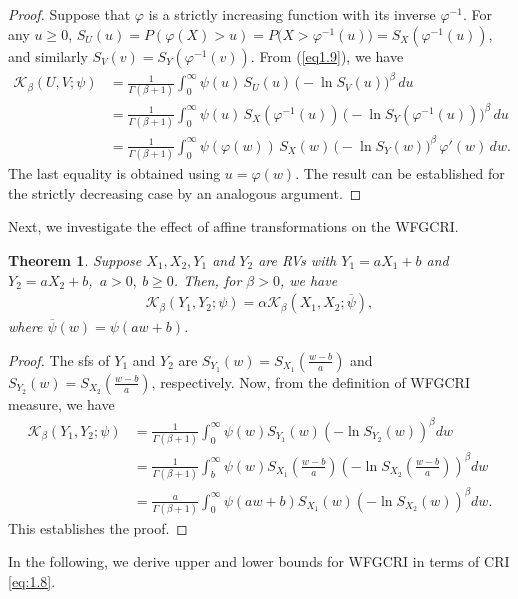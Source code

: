 \documentclass[12pt,a4paper]{article}
\numberwithin{equation}{section}
\newtheorem{theorem}{Theorem}[section]
\begin{document}
\begin{proof}
Suppose that $\varphi$ is a strictly increasing function  with its  inverse $\varphi^{-1}$. For any $u\ge0$,
$S_U(u)=P(\varphi(X)>u)
= P\!\big(X>\varphi^{-1}(u)\big)
= S_X(\varphi^{-1}(u)),$
and similarly $ S_V(v)= S_Y(\varphi^{-1}(v))$.
From (\ref{eq1.9}), we have
\begin{align*}
\mathcal K_\beta(U,V;\psi)
&=\frac{1}{\Gamma(\beta+1)}\int_0^\infty 
\psi(u)\,S_U(u)\,
\big(-\ln S_V(u)\big)^{\beta}\,du \\ &=\frac{1}{\Gamma(\beta+1)}\int_0^\infty 
\psi(u)\,S_X(\varphi^{-1}(u))\,
\big(-\ln S_Y(\varphi^{-1}(u))\big)^{\beta}\,du \\
&=\frac{1}{\Gamma(\beta+1)} \int_0^\infty 
\psi(\varphi(w))\,S_X(w)\,
\big(-\ln S_Y(w)\big)^{\beta}\,
\varphi'(w)\,dw .
\end{align*} The last equality is obtained using $u=\varphi(w)$. The result can be established for the strictly decreasing case by an analogous argument.
\end{proof}
Next, we investigate the effect of affine transformations on the WFGCRI. 
	\begin{theorem}
		Suppose $X_1,X_2,Y_1$ and $Y_2$ are RVs with $Y_1=aX_1+b$ and $Y_2=aX_2+b$,~$a>0,~b\geq 0$. Then, for $\beta>0$, we have 
		\begin{align*}
			\mathcal K_\beta(Y_1,Y_2;\psi)=\alpha 	\mathcal K_\beta(X_1,X_2;\overline{\psi}),
		\end{align*}
		where $\overline \psi(w)=\psi(aw+b)$.
	\end{theorem}
	\begin{proof}
The sfs of $Y_1$ and $Y_2$ are $S_{Y_1} (w) = S_{X_1} \left(\frac{w-b}{a}\right)$ and $S_{Y_2} (w) = S_{X_2} \left(\frac{w-b}{a}\right)$, respectively. Now, from the definition of WFGCRI measure, we have
\begin{align*}
		\mathcal K_\beta(Y_1,Y_2;\psi)&=\frac{1}{\Gamma(\beta+1)}\int_0^{\infty} \psi(w)S_{Y_1}(w)\left(-\ln S_{Y_2}(w)\right)^\beta dw\\
		&=\frac{1}{\Gamma(\beta+1)}\int_b^{\infty} \psi\left(w\right)S_{X_1}\left(\frac{w-b}{a}\right)\left(-\ln S_{X_2}\left(\frac{w-b}{a}\right)\right)^\beta dw\\
		&=\frac{a}{\Gamma(\beta+1)}\int_0^{\infty} \psi(aw+b)S_{X_1}(w)\left(-\ln S_{X_2}(w)\right)^\beta dw.
\end{align*}
This establishes the proof.
	\end{proof}
In the following, we derive upper and lower bounds for WFGCRI in terms of CRI \eqref{eq:1.8}.
\end{document}
